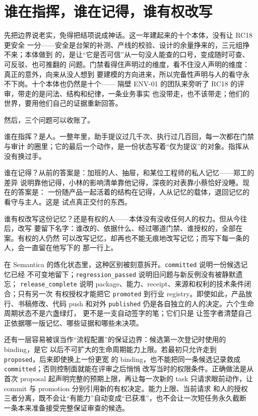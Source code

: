 \section{谁在指挥，谁在记得，谁有权改写}

先把边界说老实，免得把结项说成神话。这一年建起来的十个本体，没有让 RC18 更安全
一分——安全是台架的补测、产线的校验、设计的余量挣来的，三元组挣不来；本体做到
的，是让“它是否可信”从一句没人能查的口号，变成随时可查、可反驳、也可推翻的
问题。门禁看得住声明过的维度，看不住没人声明的维度：真正的意外，向来从没人想到
要建模的方向进来，所以完备性声明与人的看守永不下岗。十个本体也仍然是十个——
隔壁 ENV-01 的团队来旁听了 RC18 的评审，带走的是问法、结构和纪律，一条业务事实
也没带走，也不该带走；他们的世界，要用他们自己的证据重新回答。

然后，三个问题可以收账了。

谁在指挥？是人。一整年里，助手提议过几千次、执行过几百回，每一次都在门禁与审计
的圈里；它的最后一个动作，是一份状态写着“仅为提议”的对象。指挥从没有换过手。

谁在记得？从前的答案是：加班的人、抽屉，和某位工程师的私人记忆——郑工的差异
说明靠他记得，小林的影响清单靠他记得，深夜的对表靠小蔡恰好没睡。现在的答案是：
一份随产品一起活着的结构在记得，人从记忆的载体，退回记忆的看守与主人。这是
试点真正交付的东西。

谁有权改写这份记忆？还是有权的人——本体没有没收任何人的权力。但从今往后，改写
要留下名字：谁改的、依据什么、经过哪道门禁、谁授权的，全部在案。有权的人仍然
可以改写记忆，却再也不能无痕地改写记忆；而写下每一条的人，会一直留在他写下的
那一行上。

在 Semantica 的炼化状态里，这种区别被刻意拆开。\nolinkurl{committed} 说明一份候选记忆已经
不可变地留下；\nolinkurl{regression_passed} 说明旧问题与新反例没有被静默遗忘；
\nolinkurl{release_complete} 说明 package、能力、receipt、来源和权利的技术条件闭合；只有另一次
有权授权才能把它 \nolinkurl{promoted} 到行业 registry。即使如此，产品放行、书稿修改、代码 push
和对外 \nolinkurl{published} 仍是各自独立的人的决定。六个生命周期状态不是六盏绿灯，
更不是一支自动签字的笔；它们只是
让签字者清楚自己正依据哪一版记忆、哪些证据和哪些未决项。

还有一层容易被误当作“流程配置”的保证边界：候选第一次登记时使用的 binding，是它
以后不可扩大的生命周期能力上限。若最初只允许走到 \nolinkurl{proposed}，后来即使换上一份更宽
的 binding，也不能把同一条候选记录救成 \nolinkurl{committed}；否则控制面就能在评审之后悄悄
改写当时的权限条件。正确做法是从首次 proposal 起声明完整的预期上限，再让每一次新的
task 只请求眼前动作，让 commit 与 promotion 分别引用新的有权决定。能力上限、当前请求
和人的授权三者分离，既不会让“有能力”自动变成“已获准”，也不会让一次短任务永久截断
一条本来准备接受完整保证审查的候选。

